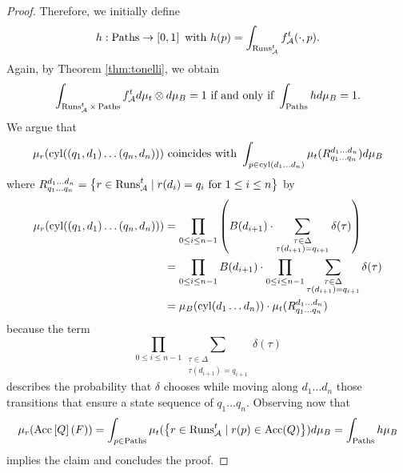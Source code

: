 \begin{proof}
  Therefore, we initially define
  \begin{equation*}
    h:\operatorname{Paths}\rightarrow\left[0,1\right]\text{ with }
      h(p) = \int_{\operatorname{Runs}_{\mathcal{A}}^{t}}f_{\mathcal{A}}^{t}(\cdot, p).
  \end{equation*}
  Again, by Theorem \ref{thm:tonelli}, we obtain
  \begin{equation*}
    \int_{\operatorname{Runs}_{\mathcal{A}}^{t}\times\operatorname{Paths}}f_{\mathcal{A}}^{t}
      d\mu_{t}\otimes d\mu_{B} = 1
    \text{ if and only if }\int_{\operatorname{Paths}}h d\mu_{B} = 1.
  \end{equation*}
  We argue that 
  \begin{equation*}
    \mu_{r}(\operatorname{cyl}(\left(q_{1}, d_{1}\right)\dots\left(q_{n}, d_{n}\right)))
    \text{ coincides with }\int_{p\in\operatorname{cyl}(d_{1}\dots d_{n})}\mu_{t}(
    R^{d_{1}\dots d_{n}}_{q_{1}\dots q_{n}})d\mu_{B}
  \end{equation*} 
  where $R^{d_{1}\dots d_{n}}_{q_{1}\dots q_{n}} = \left\{
    r\in\operatorname{Runs}_{\mathcal{A}}^{t}\mid r(d_{i}) = q_{i}\text{ for }1\leq i\leq n\right\}$
  by
  \begin{align*}
    \mu_{r}(\operatorname{cyl}(\left(q_{1}, d_{1}\right)\dots\left(q_{n}, d_{n}\right))) &=
      \prod\limits_{0\leq i\leq n-1}\left(B(d_{i+1})\cdot\sum\limits_{
        \substack{\tau\in\Delta\\\tau(d_{i+1}) = q_{i+1}}}\delta(\tau)\right)\\
    &=\prod\limits_{0\leq i\leq n-1}B(d_{i+1})\cdot\prod
        \limits_{0\leq i\leq n-1}\sum\limits_{\substack{
        \tau\in\Delta\\\tau(d_{i+1}) = q_{i+1}}}\delta(\tau)\\
    &=\mu_{B}(\operatorname{cyl}(d_{1}\dots d_{n}))\cdot\mu_{t}(
        R^{d_{1}\dots d_{n}}_{q_{1}\dots q_{n}})\\
  \end{align*}
  because the term
  \begin{equation*}
    \prod\limits_{0\leq i\leq n-1}\sum\limits_{\substack{
    \tau\in\Delta\\\tau(d_{i+1}) = q_{i+1}}}\delta(\tau)
  \end{equation*} 
  describes the probability that $\delta$ chooses while moving along
  $d_{1}\dots d_{n}$ those transitions that ensure a state sequence  of
  $q_{1}\dots q_{n}$. Observing now that
  \begin{equation*}
    \mu_{r}(\operatorname{Acc}\left[Q\right](F)) = 
    \int_{p\in\operatorname{Paths}}\mu_{t}(\left\{r\in\operatorname{Runs}_{\mathcal{A}}^{t}\mid
      r(p)\in\operatorname{Acc}(Q)\right\}) d\mu_{B} = \int_{\operatorname{Paths}} h\mu_{B}
  \end{equation*}
  implies the claim and concludes the proof.
\end{proof}
